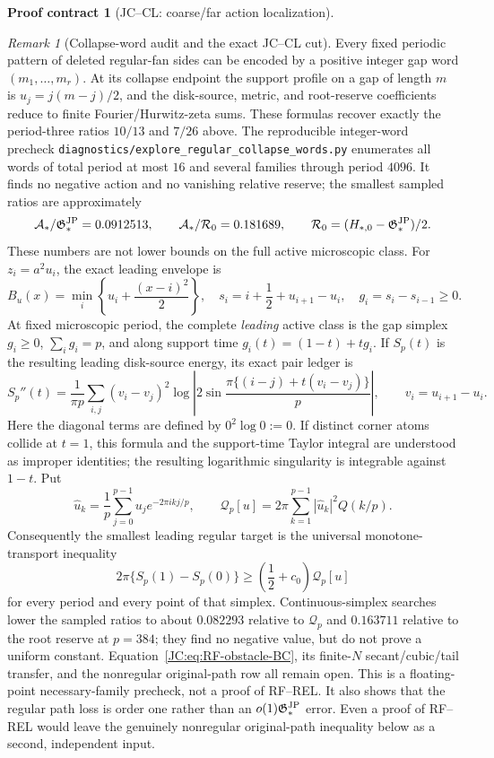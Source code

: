 \documentclass[11pt]{amsart}
\providecommand{\mathscr}{\mathcal}
\numberwithin{equation}{section}
\theoremstyle{definition}
\newtheorem{contract}[theorem]{Proof contract}
\theoremstyle{remark}
\newtheorem{remark}[theorem]{Remark}
\newcommand{\Gjp}{\mathfrak G^{\rm JP}}
\providecommand{\mathscr}[1]{\mathcal{#1}}
\begin{document}
\begin{contract}[JC--CL: coarse/far action localization]
\begin{remark}[Collapse-word audit and the exact JC--CL cut]
\label{JC:rem:RF-collapse-word-audit}
Every fixed periodic pattern of deleted regular-fan sides can be encoded
by a positive integer gap word $(m_1,\ldots,m_r)$.  At its collapse
endpoint the support profile on a gap of length $m$ is
$u_j=j(m-j)/2$, and the disk-source, metric, and root-reserve
coefficients reduce to finite Fourier/Hurwitz-zeta sums.  These formulas
recover exactly the period-three ratios $10/13$ and $7/26$ above.
The reproducible integer-word precheck
\texttt{diagnostics/explore\_regular\_collapse\_words.py} enumerates all
words of total period at most $16$ and several families through period
$4096$.  It finds no negative action and no vanishing relative reserve;
the smallest sampled ratios are approximately
\[
 \mathscr A_*/\Gjp_*=0.0912513,
 \qquad \mathscr A_*/\mathcal R_0=0.181689,
 \qquad \mathcal R_0=(H_{*,0}-\Gjp_*)/2.
\]
These numbers are not lower bounds on the full active microscopic class.
For $z_i=a^2u_i$, the exact leading envelope is
\[
 B_u(x)=\min_i\left\{u_i+\frac{(x-i)^2}{2}\right\},
 \quad s_i=i+\frac12+u_{i+1}-u_i,
 \quad g_i=s_i-s_{i-1}\ge0.
\]
At fixed microscopic period, the complete \emph{leading} active class is
the gap simplex
$g_i\ge0$, $\sum_i g_i=p$, and along support time
$g_i(t)=(1-t)+tg_i$.  If $S_p(t)$ is the resulting leading disk-source
energy, its exact pair ledger is
\[
 S_p''(t)=\frac1{\pi p}\sum_{i,j}(v_i-v_j)^2
 \log\left|2\sin\frac{\pi\{(i-j)+t(v_i-v_j)\}}p\right|,
 \qquad v_i=u_{i+1}-u_i.
\]
Here the diagonal terms are defined by \(0^2\log0:=0\).  If distinct
corner atoms collide at \(t=1\), this formula and the support-time Taylor
integral are understood as improper identities; the resulting logarithmic
singularity is integrable against \(1-t\).
Put
\[
 \widehat u_k=\frac1p\sum_{j=0}^{p-1}u_j e^{-2\pi i k j/p},
 \qquad
 \mathcal Q_p[u]=2\pi\sum_{k=1}^{p-1}
       |\widehat u_k|^2Q(k/p).
\]
Consequently the smallest leading regular target is the universal
monotone-transport inequality
\begin{equation}\label{JC:eq:RF-obstacle-BC}
 2\pi\{S_p(1)-S_p(0)\}
 \ge\left(\frac12+c_0\right)\mathcal Q_p[u]
\end{equation}
for every period and every point of that simplex.  Continuous-simplex
searches lower the sampled ratios to about $0.082293$ relative to
$\mathcal Q_p$ and $0.163711$ relative to the root reserve at $p=384$;
they find no negative value, but do not prove a uniform constant.
Equation~\eqref{JC:eq:RF-obstacle-BC}, its finite-$N$ secant/cubic/tail
transfer, and the nonregular original-path row all remain open.
This is a floating-point necessary-family precheck, not a proof of
RF--REL.  It also shows that the regular path loss is order one rather
than an $o(1)\Gjp_*$ error.  Even a proof of RF--REL would leave the
genuinely nonregular original-path inequality below as a second,
independent input.
\end{remark}


\end{contract}
\end{document}
